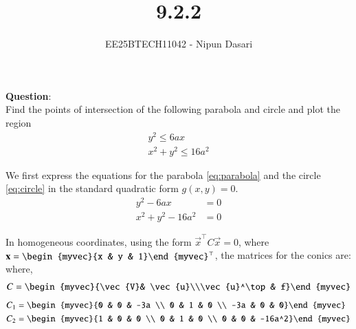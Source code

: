 \documentclass[journal]{IEEEtran}
\begin{document}
	
	
	\vspace{3cm}
	
	\title{9.2.2}
	\author{EE25BTECH11042 - Nipun Dasari}
	\maketitle
	
	\renewcommand{\thefigure}{\theenumi}
	\renewcommand{\thetable}{\theenumi}
	\setlength{\intextsep}{10pt}
	
	\renewcommand{\thetable}{\theenumi}
	
	\textbf{Question}:\\
	Find the points of intersection of the following parabola and circle and plot the region 
	\begin{align}
		y^2 \le 6ax \label{eq:parabola} \\
		x^2 + y^2 \le 16a^2 \label{eq:circle}
	\end{align}
	
	\solution
	
	We first express the equations for the parabola \eqref{eq:parabola} and the circle \eqref{eq:circle} in the standard quadratic form $g(x,y)=0$.
	\begin{align}
		y^2 - 6ax &= 0 \label{eq:P1} \\
		x^2 + y^2 - 16a^2 &= 0 \label{eq:C2}
	\end{align}
	
	In homogeneous coordinates, using the form $\vec{x}^\top C \vec{x} = 0$, where $\vec{x} = \begin{myvec}{x & y & 1}\end{myvec}^\top$, the matrices for the conics are:\\
	where,
	\begin{align}
		C = \begin{myvec}{\vec{V}& \vec{u}\\\vec{u}^\top & f}\end{myvec}
	\end{align}
	\begin{align}
		C_1 &= \begin{myvec}{0 & 0 & -3a \\ 0 & 1 & 0 \\ -3a & 0 & 0}\end{myvec} \label{eq:C1_matrix} \\
		C_2 &= \begin{myvec}{1 & 0 & 0 \\ 0 & 1 & 0 \\ 0 & 0 & -16a^2}\end{myvec} \label{eq:C2_matrix}
	\end{align}
	
\end{document}
